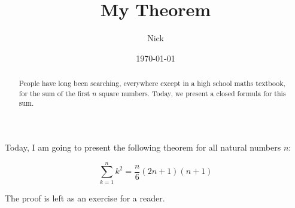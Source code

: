 \documentclass{article}
\title{My Theorem}
\author{Nick}
\date{\today}
\begin{document}
\maketitle

\begin{abstract}
    People have long been searching, everywhere except in a high school maths textbook, for the sum of the first $n$ square numbers. Today, we present a closed formula for this sum.
\end{abstract}

Today, I am going to present the following theorem for all natural numbers $n$:

\[
    \sum^n_{k=1}k^2=\frac{n}{6}(2n+1)(n+1)
\]

The proof is left as an exercise for a reader.
\end{document}

